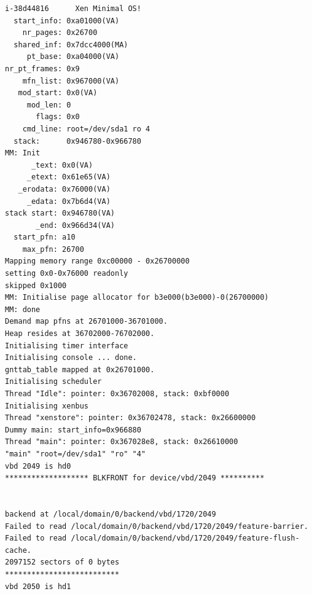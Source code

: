\begin{lstlisting}[float,basicstyle=\scriptsize,label=code:nbsdboot1,caption={Excerpt
of the boot messages of a NetBSD Xen
domU\index{Xen!domU} booting in
Amazon EC2}]
i-38d44816      Xen Minimal OS!
  start_info: 0xa01000(VA)
    nr_pages: 0x26700
  shared_inf: 0x7dcc4000(MA)
     pt_base: 0xa04000(VA)
nr_pt_frames: 0x9
    mfn_list: 0x967000(VA)
   mod_start: 0x0(VA)
     mod_len: 0
       flags: 0x0
    cmd_line: root=/dev/sda1 ro 4
  stack:      0x946780-0x966780
MM: Init
      _text: 0x0(VA)
     _etext: 0x61e65(VA)
   _erodata: 0x76000(VA)
     _edata: 0x7b6d4(VA)
stack start: 0x946780(VA)
       _end: 0x966d34(VA)
  start_pfn: a10
    max_pfn: 26700
Mapping memory range 0xc00000 - 0x26700000
setting 0x0-0x76000 readonly
skipped 0x1000
MM: Initialise page allocator for b3e000(b3e000)-0(26700000)
MM: done
Demand map pfns at 26701000-36701000.
Heap resides at 36702000-76702000.
Initialising timer interface
Initialising console ... done.
gnttab_table mapped at 0x26701000.
Initialising scheduler
Thread "Idle": pointer: 0x36702008, stack: 0xbf0000
Initialising xenbus
Thread "xenstore": pointer: 0x36702478, stack: 0x26600000
Dummy main: start_info=0x966880
Thread "main": pointer: 0x367028e8, stack: 0x26610000
"main" "root=/dev/sda1" "ro" "4" 
vbd 2049 is hd0
******************* BLKFRONT for device/vbd/2049 **********


backend at /local/domain/0/backend/vbd/1720/2049
Failed to read /local/domain/0/backend/vbd/1720/2049/feature-barrier.
Failed to read /local/domain/0/backend/vbd/1720/2049/feature-flush-cache.
2097152 sectors of 0 bytes
**************************
vbd 2050 is hd1
\end{lstlisting}

